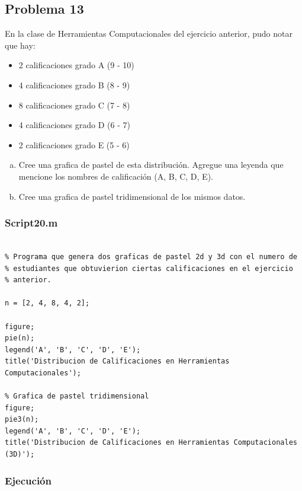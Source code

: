 \documentclass{article}
\begin{document}
	\subsection{Problema 13}
	
	En la clase de Herramientas Computacionales del ejercicio anterior, pudo notar que hay:
	\begin{itemize}
		\item 2 calificaciones grado A (9 - 10)
		\item 4 calificaciones grado B (8 - 9)
		\item 8 calificaciones grado C (7 - 8)
		\item 4 calificaciones grado D (6 - 7)
		\item 2 calificaciones grado E (5 - 6)
	\end{itemize}
	
	\begin{enumerate}[a)]
		\item Cree una grafica de pastel de esta distribución. Agregue una leyenda que mencione los nombres de calificación (A, B, C, D, E).
		\item Cree una grafica de pastel tridimensional de los mismos datos.
	\end{enumerate}
	
	\subsubsection{Script20.m}
	
	\begin{lstlisting}

% Programa que genera dos graficas de pastel 2d y 3d con el numero de 
% estudiantes que obtuvierion ciertas calificaciones en el ejercicio
% anterior.

n = [2, 4, 8, 4, 2];

figure;
pie(n);
legend('A', 'B', 'C', 'D', 'E');
title('Distribucion de Calificaciones en Herramientas Computacionales');

% Grafica de pastel tridimensional
figure;
pie3(n);
legend('A', 'B', 'C', 'D', 'E');
title('Distribucion de Calificaciones en Herramientas Computacionales (3D)');

	\end{lstlisting}
	
	\subsubsection{Ejecución}
	
\end{document}
